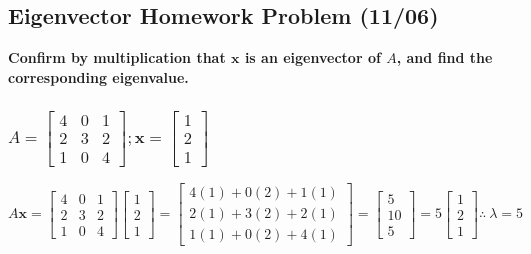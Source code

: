 \documentclass[
  letterpaper,
  DIV=11,
  numbers=noendperiod]{scrartcl}
\begin{document}
\hypertarget{eigenvector-homework-problem-1106}{%
\subsection{Eigenvector Homework Problem
(11/06)}\label{eigenvector-homework-problem-1106}}

\textbf{Confirm by multiplication that \(\symbf{x}\) is an eigenvector
of \(A\), and find the corresponding eigenvalue.}

\hypertarget{a-beginbmatrix4-0-1-2-3-2-1-0-4-endbmatrix-symbfx-beginbmatrix1-2-1endbmatrix}{%
\subsubsection{\texorpdfstring{\(A = \begin{bmatrix}4 & 0 & 1 \\ 2 & 3 & 2 \\ 1 & 0 & 4 \end{bmatrix}; \symbf{x} = \begin{bmatrix}1 \\ 2 \\ 1\end{bmatrix}\)}{A = \textbackslash begin\{bmatrix\}4 \& 0 \& 1 \textbackslash\textbackslash{} 2 \& 3 \& 2 \textbackslash\textbackslash{} 1 \& 0 \& 4 \textbackslash end\{bmatrix\}; \textbackslash symbf\{x\} = \textbackslash begin\{bmatrix\}1 \textbackslash\textbackslash{} 2 \textbackslash\textbackslash{} 1\textbackslash end\{bmatrix\}}}\label{a-beginbmatrix4-0-1-2-3-2-1-0-4-endbmatrix-symbfx-beginbmatrix1-2-1endbmatrix}}

\(A\symbf{x} = \begin{bmatrix}4 & 0 & 1 \\ 2 & 3 & 2 \\ 1 & 0 & 4 \end{bmatrix}\begin{bmatrix}1 \\ 2 \\ 1\end{bmatrix} = \begin{bmatrix}4(1)+0(2)+1(1) \\ 2(1)+3(2)+2(1) \\ 1(1)+0(2)+4(1)\end{bmatrix} = \begin{bmatrix}5 \\ 10 \\ 5\end{bmatrix} = 5\begin{bmatrix}1 \\ 2 \\ 1\end{bmatrix} \therefore \ \lambda = 5\)
\end{document}
